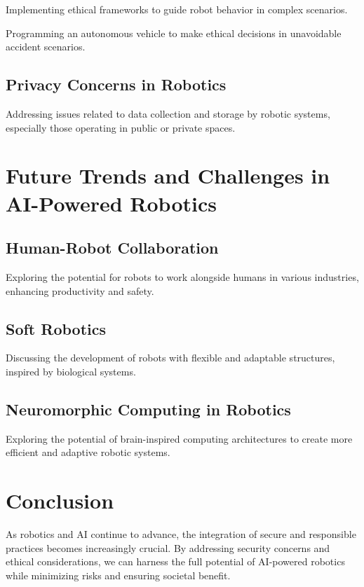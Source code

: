 \documentclass[
]{article}
\begin{document}
Implementing ethical frameworks to guide robot behavior in complex
scenarios.

\begin{example}
Programming an autonomous vehicle to make ethical decisions in unavoidable accident scenarios.
\end{example}

\subsection{Privacy Concerns in Robotics}

Addressing issues related to data collection and storage by robotic
systems, especially those operating in public or private spaces.

\section{Future Trends and Challenges in AI-Powered Robotics}

\subsection{Human-Robot Collaboration}

Exploring the potential for robots to work alongside humans in various
industries, enhancing productivity and safety.

\subsection{Soft Robotics}

Discussing the development of robots with flexible and adaptable
structures, inspired by biological systems.

\subsection{Neuromorphic Computing in Robotics}

Exploring the potential of brain-inspired computing architectures to
create more efficient and adaptive robotic systems.

\section{Conclusion}

As robotics and AI continue to advance, the integration of secure and
responsible practices becomes increasingly crucial. By addressing
security concerns and ethical considerations, we can harness the full
potential of AI-powered robotics while minimizing risks and ensuring
societal benefit.
\end{document}
